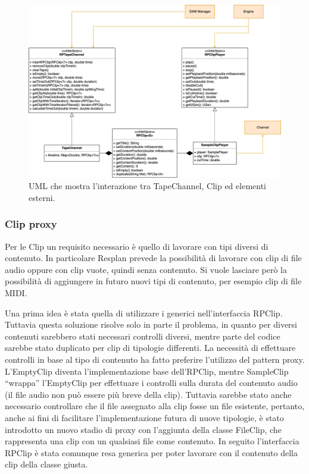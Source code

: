 \documentclass[a4paper,12pt]{report}
\begin{document}
\begin{figure}[H]
\centering{}
\includegraphics[width=\textwidth]{img/tapechannel.png}
\caption{UML che mostra l'interazione tra TapeChannel, Clip ed elementi esterni.}
\end{figure}

\subsubsection{Clip proxy}
Per le Clip un requisito necessario è quello di lavorare con tipi diversi di contenuto. In particolare Resplan prevede la possibilità di lavorare con clip di file audio oppure con clip vuote, quindi senza contenuto. Si vuole lasciare però la possibilità di aggiungere in futuro nuovi tipi di contenuto, per esempio clip di file MIDI.

Una prima idea è stata quella di utilizzare i generici nell’interfaccia RPClip. Tuttavia questa soluzione risolve solo in parte il problema, in quanto per diversi contenuti sarebbero stati necessari controlli diversi, mentre parte del codice sarebbe stato duplicato per clip di tipologie differenti.
La necessità di effettuare controlli in base al tipo di contenuto ha fatto preferire l’utilizzo del pattern proxy.
L’EmptyClip diventa l’implementazione base dell’RPClip, mentre SampleClip “wrappa” l’EmptyClip per effettuare i controlli sulla durata del contenuto audio (il file audio non può essere più breve della clip).
Tuttavia sarebbe stato anche necessario controllare che il file assegnato alla clip fosse un file esistente, pertanto, anche ai fini di facilitare l’implementazione futura di nuove tipologie, è stato introdotto un nuovo stadio di proxy con l’aggiunta della classe FileClip, che rappresenta una clip con un qualsiasi file come contenuto.
In seguito l’interfaccia RPClip è stata comunque resa generica per poter lavorare con il contenuto della clip della classe giusta.
\end{document}
